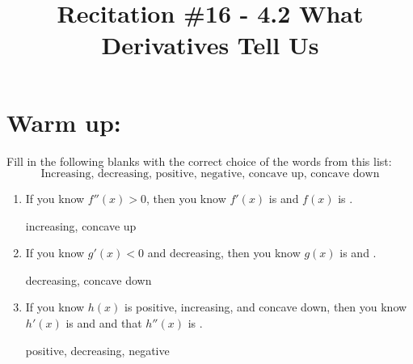 \documentclass[handout,nooutcomes]{ximera}
\title{Recitation \#16 - 4.2 What Derivatives Tell Us}
\begin{document}
\begin{abstract}		\end{abstract}
\maketitle

\section*{Warm up:} 
Fill in the following blanks with the correct choice of the words from this list:
$$ \text{Increasing, decreasing, positive, negative, concave up, concave down} $$

	\begin{enumerate}
	
	\item  If you know $f''(x) > 0$, then you know $f'(x)$ is \underline{\hspace{3cm}} and $f(x)$ is \underline{\hspace{3cm}}.
		\begin{freeResponse}
		increasing, concave up
		\end{freeResponse}
		
			
				
	\item  If you know $g'(x) < 0$ and decreasing, then you know $g(x)$ is \underline{\hspace{3cm}} and \underline{\hspace{3cm}}.
		\begin{freeResponse}
		decreasing, concave down
		\end{freeResponse}
		
			
				
	\item  If you know $h(x)$ is positive, increasing, and concave down, then you know $h'(x)$ is \underline{\hspace{3cm}} and \underline{\hspace{3cm}} and that $h''(x)$ is \underline{\hspace{3cm}}.
		\begin{freeResponse}
		positive, decreasing, negative
		\end{freeResponse}
		
			
				
	\end{enumerate}	
		
		
		
\end{document}
